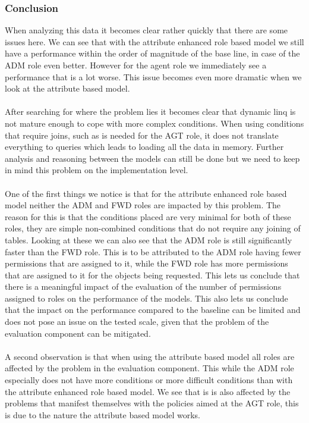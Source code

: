 \subsubsection{Conclusion}
When analyzing this data it becomes clear rather quickly that there are some issues here.
We can see that with the attribute enhanced role based model we still have a performance within the order of magnitude of the base line, in case of the ADM role even better.
However for the agent role we immediately see a performance that is a lot worse.
This issue becomes even more dramatic when we look at the attribute based model.
\\
\\
After searching for where the problem lies it becomes clear that dynamic linq is not mature enough to cope with more complex conditions.
When using conditions that require joins, such as is needed for the AGT role, it does not translate everything to queries which leads to loading all the data in memory.
Further analysis and reasoning between the models can still be done but we need to keep in mind this problem on the implementation level.
\\
\\
One of the first things we notice is that for the attribute enhanced role based model neither the ADM and FWD roles are impacted by this problem.
The reason for this is that the conditions placed are very minimal for both of these roles, they are simple non-combined conditions that do not require any joining of tables.
Looking at these we can also see that the ADM role is still significantly faster than the FWD role.
This is to be attributed to the ADM role having fewer permissions that are assigned to it, while the FWD role has more permissions that are assigned to it for the objects being requested.
This lets us conclude that there is a meaningful impact of the evaluation of the number of permissions assigned to roles on the performance of the models.
This also lets us conclude that the impact on the performance compared to the baseline can be limited and does not pose an issue on the tested scale, given that the problem of the evaluation component can be mitigated.
\\
\\
A second observation is that when using the attribute based model all roles are affected by the problem in the evaluation component.
This while the ADM role especially does not have more conditions or more difficult conditions than with the attribute enhanced role based model.
We see that is is also affected by the problems that manifest themselves with the policies aimed at the AGT role, this is due to the nature the attribute based model works.
